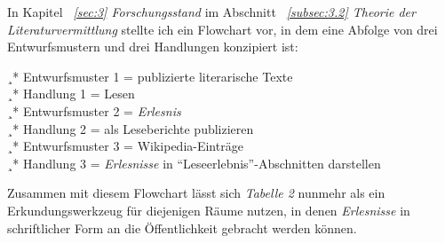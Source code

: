 \documentclass[fontsize=12pt]{scrartcl}
\begin{document}
In Kapitel \textit{~\ref{sec:3} Forschungsstand} im Abschnitt \textit{~\ref{subsec:3.2} Theorie der Literaturvermittlung} stellte ich ein Flowchart vor, in dem eine Abfolge von drei Entwurfsmustern und drei Handlungen konzipiert ist:

\singlespacing
¸* Entwurfsmuster 1 = publizierte literarische Texte\\
¸* Handlung 1 = Lesen\\
¸* Entwurfsmuster 2 = \textit{Erlesnis}\\ 
¸* Handlung 2 = als Leseberichte publizieren\\
¸* Entwurfsmuster 3 = Wikipedia-Eintr\"age\\
¸* Handlung 3 = \textit{Erlesnisse} in "`Leseerlebnis"'-Abschnitten dar\-stel\-len
\onehalfspacing

Zusammen mit diesem Flowchart l\"asst sich \textit{Tabelle 2} nunmehr als ein Er\-kun\-dungs\-werk\-zeug f\"ur diejenigen R\"aume nutzen, in denen \textit{Erlesnisse} in schriftlicher Form an die \"Of\-fent\-lichkeit gebracht werden k\"onnen. 
\end{document}
